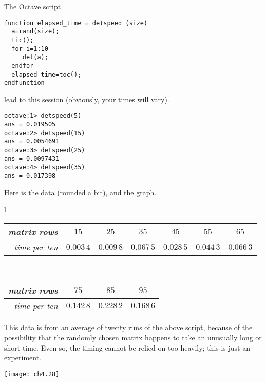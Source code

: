 \begin{exercises}
\begin{answer}
\begin{exparts}
          The Octave script
\begin{lstlisting}
function elapsed_time = detspeed (size)
  a=rand(size);
  tic();
  for i=1:10
     det(a);
  endfor
  elapsed_time=toc();
endfunction
\end{lstlisting}  
          lead to this session (obviously, your times will vary). 
\begin{lstlisting}
octave:1> detspeed(5)
ans = 0.019505
octave:2> detspeed(15)
ans = 0.0054691
octave:3> detspeed(25)
ans = 0.0097431
octave:4> detspeed(35)
ans = 0.017398
\end{lstlisting}  
          \partsitem Here is the data (rounded a bit), and the graph.
            \begin{center}
              \begin{tabular}{l}
              \begin{tabular}{r|cccccc}
                 \textit{matrix rows} 
                    &$15$ &$25$ &$35$ &$45$ &$55$ &$65$  \\
                 \hline
                 \textit{time per ten}
                    &$0.003\,4$                     
                    &$0.009\,8$
                    &$0.067\,5$
                    &$0.028\,5$ 
                    &$0.044\,3$
                    &$0.066\,3$ 
              \end{tabular}                                       \\
              \qquad\begin{tabular}{r|ccc}
                 \textit{matrix rows} 
                    &$75$ &$85$ &$95$ \\
                 \hline
                 \textit{time per ten}
                    &$0.142\,8$  
                    &$0.228\,2$ 
                    &$0.168\,6$              
              \end{tabular}
              \end{tabular}
            \end{center}
          This data is from an average of twenty runs of the above script,
          because of the possibility that the randomly chosen matrix
          happens to take an unusually long or short time.
          Even so, the timing cannot be relied on too heavily; this is
          just an experiment.
          \begin{center}
            \texttt{[image: ch4.28]}
          \end{center}
      \end{exparts}

\end{answer}
\end{exercises}
